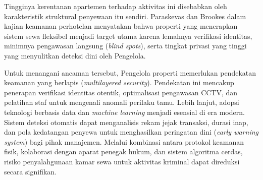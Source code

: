 Tingginya kerentanan apartemen terhadap aktivitas ini disebabkan oleh karakteristik struktural penyewaan itu sendiri. Paraskevas dan Brookes \cite{paraskevas2018polaperilaku} dalam kajian keamanan perhotelan menyatakan bahwa properti yang menerapkan sistem sewa fleksibel menjadi target utama karena lemahnya verifikasi identitas, minimnya pengawasan langsung (\textit{blind spots}), serta tingkat privasi yang tinggi yang menyulitkan deteksi dini oleh Pengelola. 

Untuk menangani ancaman tersebut, Pengelola properti memerlukan pendekatan keamanan yang berlapis (\textit{multilayered security}). Pendekatan ini mencakup penerapan verifikasi identitas otentik, optimalisasi pengawasan CCTV, dan pelatihan staf untuk mengenali anomali perilaku tamu. Lebih lanjut, adopsi teknologi berbasis data dan \textit{machine learning} menjadi esensial di era modern. Sistem deteksi otomatis dapat menganalisis rekam jejak transaksi, durasi inap, dan pola kedatangan penyewa untuk menghasilkan peringatan dini (\textit{early warning system}) bagi pihak manajemen. Melalui kombinasi antara protokol keamanan fisik, kolaborasi dengan aparat penegak hukum, dan sistem algoritma cerdas, risiko penyalahgunaan kamar sewa untuk aktivitas kriminal dapat direduksi secara signifikan.

